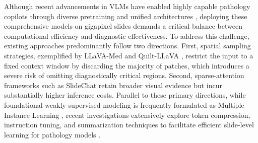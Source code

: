 \documentclass[runningheads]{llncs}
\begin{document}

Although recent advancements in VLMs have enabled highly capable pathology copilots through diverse pretraining and unified architectures \citep{Huang2023VisualLanguage, Xu2024WholeSlide, Chen2024Towards, Lu2024VisualLanguage, Lu2024Multimodal, Sun2025CPathOmni, Zhang2023TextGuided}, deploying these comprehensive models on gigapixel slides demands a critical balance between computational efficiency and diagnostic effectiveness. 
To address this challenge, existing approaches predominantly follow two directions. First, spatial sampling strategies, exemplified by LLaVA-Med \citep{Li2023LLaVAMed} and Quilt-LLaVA \citep{Seyfioglu2024QuiltLLaVA}, restrict the input to a fixed context window by discarding the majority of patches, which introduces a severe risk of omitting diagnostically critical regions. Second, sparse-attention frameworks such as SlideChat \citep{Chen2025SlideChat} retain broader visual evidence but incur substantially higher inference costs. Parallel to these primary directions, while foundational weakly supervised modeling is frequently formulated as Multiple Instance Learning \citep{Lu2021DataEfficient, Shao2021TransMIL, Hashimoto2024Multimodal, Wu2025Learning}, recent investigations extensively explore token compression, instruction tuning, and summarization techniques to facilitate efficient slide-level learning for pathology models \citep{Tang2025Revisiting, Guo2025Focus, Chen2025CostEffective, Hu2025LoCPath, Wang2026WSISum, yang2025one, young2026fewer}.
\end{document}
